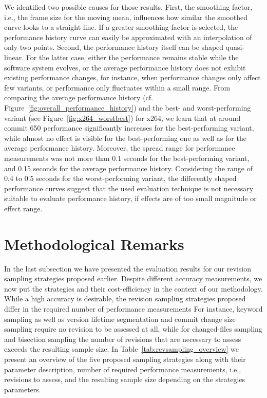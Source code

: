 We identified two possible causes for those results. First, the smoothing
factor, i.e., the frame size for the moving mean, influences how similar the
smoothed curve looks to a straight line. If a greater smoothing factor is
selected, the performance history curve can easily be approximated with an
interpolation of only two points. Second, the performance history itself can be
shaped quasi-linear. For the latter case, either the performance remains stable
while the software system evolves, or the average performance history does not
exhibit existing performance changes, for instance, when performance changes
only affect few variants, or performance only fluctuates within a small range.
From comparing the average performance history (cf.
Figure~\ref{fig:overall_performance_history}) and the best- and
worst-performing variant (see Figure~\ref{fig:x264_worstbest}) for x264, we
learn that at around commit 650 performance significantly increases for the
best-performing variant, while almost no effect is visible for the
best-performing one as well as for the average performance history. Moreover, the spread range for performance measurements was not more than 0.1 seconds for
the best-performing variant, and 0.15 seconds for the average performance
history. Considering the range of 0.4 to 0.5 seconds for the worst-performing
variant, the differently shaped performance curves suggest that the used
evaluation technique is not necessary suitable to evaluate performance history,
if effects are of too small magnitude or effect range.

\section{Methodological Remarks}\label{sec:revsampling_method}
In the last subsection we have presented the evaluation results for our
revision sampling strategies proposed earlier. Despite different accuracy
measurements, we now put the strategies and their cost-efficiency in the context
of our methodology. While a high accuracy is desirable, the revision sampling
strategies proposed differ in the required number of performance measurements
For instance, keyword sampling as well as version lifetime segmentation and
commit change size sampling require no revision to be assessed at all, while
for changed-files sampling and bisection sampling the number of revisions that
are necessary to assess exceeds the resulting sample size. In
Table~\ref{tab:revsampling_overview} we present an overview of the five proposed sampling strategies along with their
parameter description, number of required performance measurements, i.e.,
revisions to assess, and the resulting sample size depending on the strategies
parameters.

